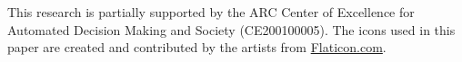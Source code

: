 This research is partially supported by the ARC Center of Excellence for Automated Decision Making and Society (CE200100005).
The icons used in this paper are created and contributed by the artists from \url{Flaticon.com}.